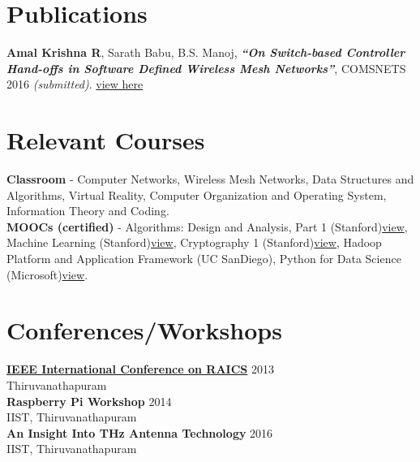 \documentclass{resume}
\begin{document}
\begin{multicols}{2}

\section{Publications}
\textbf{Amal Krishna R}, Sarath Babu, B.S. Manoj, \textit{\textbf{``On Switch-based Controller Hand-offs in Software Defined Wireless Mesh Networks''}}, COMSNETS 2016 \textit{(submitted)}. \href{https://drive.google.com/open?id=0B7qfuVtugGPONWJrYnUtREVuQk0}{view here}


\section{Relevant Courses}

\textbf{Classroom} - Computer Networks, Wireless Mesh Networks, Data Structures and Algorithms, Virtual Reality, Computer Organization and Operating System, Information Theory and Coding.\\[.05in]
\textbf{MOOCs (certified)} - Algorithms: Design and Analysis, Part 1 (Stanford)\href{https://www.coursera.org/account/accomplishments/verify/BABXLHJWG79W}{view}, Machine Learning (Stanford)\href{https://www.coursera.org/account/accomplishments/verify/39QGTRTMZAF6}{view}, Cryptography 1 (Stanford)\href{https://www.coursera.org/account/accomplishments/verify/BAYRDNQMPBBC}{view}, Hadoop Platform and Application Framework (UC SanDiego), Python for Data Science (Microsoft)\href{https://courses.edx.org/certificates/5e55bfab43f44b4d9f87be5eca9da8d9}{view}.


\section{Conferences/Workshops}

\href{http://raics.in/}{\textbf{IEEE International Conference on RAICS}} \hfill 2013\\
Thiruvanathapuram\\
\textbf{Raspberry Pi Workshop} \hfill 2014\\
IIST, Thiruvanathapuram\\
\textbf{An Insight Into THz Antenna Technology} \hfill 2016\\
IIST, Thiruvanathapuram\\


\end{multicols}
\end{document}

